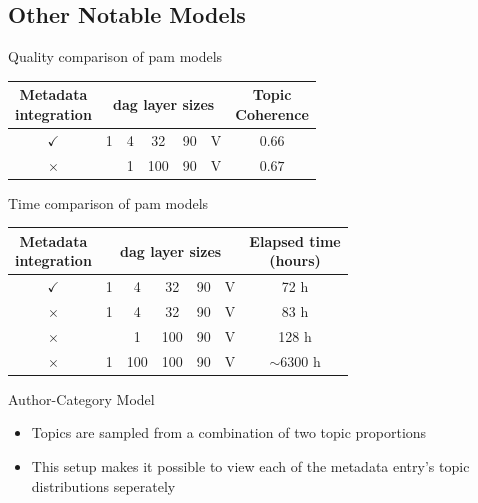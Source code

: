 \subsection{Other Notable Models}

\begin{frame}{\insertsubsection}{Quality comparison of \acrshort{pam} models}
	\centering
	\begin{tabular}{c|c|c|c|c|c|c}
		\makecell{Metadata \\ integration} & \multicolumn{5}{c}{\acrshort{dag} layer sizes} \vline & \makecell{Topic \\ Coherence} \\
		\hline
		$\checkmark$ & 1 & 4 & 32 & 90 & V & $0.66$\\
		$\times$ & & 1 & 100 & 90 & V & $0.67$ \\
	\end{tabular}
\end{frame}


\begin{frame}{\insertsubsection}{Time comparison of \acrshort{pam} models}
	\begin{tabular}{c|c|c|c|c|c|c}
		\makecell{Metadata \\ integration} & \multicolumn{5}{c}{\acrshort{dag} layer sizes} \vline & \makecell{Elapsed time \\ (hours)} \\
		\hline
		$\checkmark$ & 1 & 4 & 32 & 90 & V & 72 h\\
		$\times$ & 1 & 4 & 32 & 90 & V & 83 h\\
		$\times$ & & 1 & 100 & 90 & V &  128 h\\
		$\times$ & 1 & 100 & 100 & 90 & V & $\sim 6300$ h\\
	\end{tabular}
\end{frame}

\begin{frame}{\insertsubsection}{Author-Category Model}
	\begin{figure}
		\centering
		\resizebox{0.3\columnwidth}{!}{%
			
		}
	\end{figure}
	\begin{itemize}
		\item<1-> Topics are sampled from a combination of two topic proportions
		\item<2-> This setup makes it possible to view each of the metadata entry's topic distributions seperately
	\end{itemize}
\end{frame}

